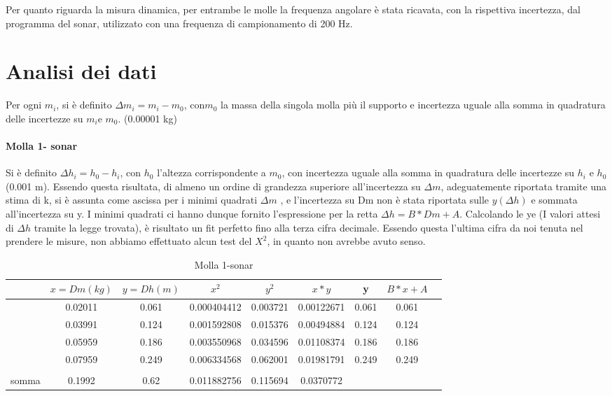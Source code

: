 \documentclass{article}
\begin{document}
 Per quanto riguarda la misura dinamica, per entrambe le molle la frequenza angolare è stata ricavata, con la rispettiva incertezza, dal programma del sonar, utilizzato con una frequenza di campionamento di 200 Hz. 


\section{Analisi dei dati}

Per ogni $m_i$, si è definito  $\Delta m_i= m_i -m_0$, con$ m_0$ la massa della singola molla più il supporto e incertezza uguale alla somma in quadratura delle  incertezze su $m_i $e $m_0$. (0.00001 kg) 

\paragraph{Molla 1- sonar}
Si è definito $\Delta h_i=h_0-h_i$, con $h_0$ l'altezza corrispondente a $m_0$, con incertezza uguale alla somma in quadratura delle incertezze su $h_i$ e $h_0$  (0.001 m). 
Essendo questa risultata, di almeno un ordine di grandezza superiore all’incertezza su $\Delta m$, adeguatemente riportata tramite una stima di k, si è assunta come ascissa per i minimi quadrati $\Delta m$ , e l'incertezza su Dm non è stata riportata sulle $y(\Delta h)$ e sommata all'incertezza su y. I minimi quadrati ci hanno dunque fornito l'espressione per la retta $\Delta h=B*Dm+A. $ 
Calcolando le ye (I valori attesi di $\Delta h$ tramite la legge trovata), è risultato un fit perfetto fino alla terza cifra decimale. Essendo questa l'ultima cifra da noi tenuta nel prendere le misure, non abbiamo effettuato alcun test del $X ^2 $, in quanto non avrebbe avuto senso. 


\begin{table}[h]
    \centering
    \begin{tabular}{|c|c|c|c|c|c|c|c|c|}
      & $ x=Dm (kg)$	& $y=Dh (m)$	& $x^2	$& $y^2$ &	$x*y$	 & y	& $B*x+A$ \\
       \hline
& 0.02011	 &0.061 &	0.000404412	&0.003721 &	0.00122671 &	0.061 &	0.061 \\
\hline
&0.03991	 & 0.124	& 0.001592808	&0.015376	&0.00494884 &	0.124	&0.124 \\
\hline
&0.05959 &	0.186&	0.003550968 &	0.034596	&0.01108374 &	0.186	&0.186 \\
\hline
&0.07959	&0.249	&0.006334568&	0.062001	&0.01981791	&0.249	&0.249 \\
						\hline
    \\
    \hline
somma & 0.1992	&0.62 &	0.011882756	&0.115694 &	0.0370772	\\	
\hline
    \end{tabular}
    \caption{Molla 1-sonar}
    \label{tab:my_label}
\end{table}
\end{document}
